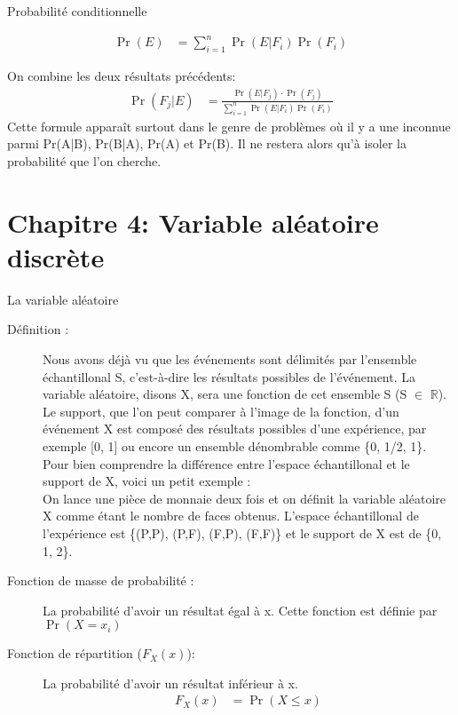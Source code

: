 \documentclass[10pt, french]{article}
\begin{document}
\begin{multicols*}{3}
\begin{probch3}{Probabilité conditionnelle}
\begin{description}
	\begin{align*}
		\Pr(E)	&=	\sum_{i = 1}^{n} \Pr(E | F_{i}) \Pr(F_{i})
	\end{align*}
	\item[Formule de Bayes: ]	On combine les deux résultats précédents:
	\begin{align*}
		\Pr(F_{j} | E) 
		&=	\frac{\Pr(E | F_{j}) \cdot \Pr(F_{j})}{\sum_{i = 1}^{n} \Pr(E | F_{i}) \Pr(F_{i})}
	\end{align*}
	Cette formule apparaît surtout dans le genre de problèmes où il y a une inconnue parmi Pr(A|B), Pr(B|A), Pr(A) et Pr(B). Il ne restera alors qu'à isoler la probabilité que l'on cherche.
\end{description}
\end{probch3}

\pagebreak
\section{Chapitre 4: Variable aléatoire discrète}
\begin{probch4}{La variable aléatoire}
  \begin{description}
    \item[Définition :] Nous avons déjà vu que les événements sont délimités par l'ensemble échantillonal S, c'est-à-dire les résultats possibles de l'événement. La variable aléatoire, disons X, sera une fonction de cet ensemble S (S $\in$ $\mathbb{R}$).\\
    Le support, que l'on peut comparer à l'image de la fonction, d'un événement X est composé des résultats possibles d'une expérience, par exemple [0, 1] ou encore un ensemble dénombrable comme \{0, 1/2, 1\}.\\
    Pour bien comprendre la différence entre l'espace échantillonal et le support de X, voici un petit exemple : \\
    On lance une pièce de monnaie deux fois et on définit la variable aléatoire X comme étant le nombre de faces obtenus. L'espace échantillonal de l'expérience est \{(P,P), (P,F), (F,P), (F,F)\} et le support de X est de \{0, 1, 2\}.
	\item [Fonction de masse de probabilité :] La probabilité d'avoir un résultat égal à x. Cette fonction est définie par $\Pr(X = x_i)$ 
	\item[Fonction de répartition ($F_{X} (x)$):] La probabilité d'avoir un résultat inférieur à x.
    \begin{align*}
    F_{X} (x) &= \Pr(X \le x) \\

\end{align*}
\end{description}
\end{probch4}
\end{multicols*}
\end{document}
